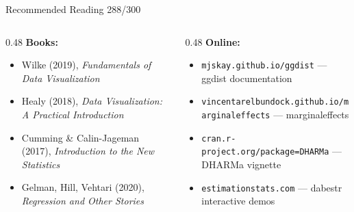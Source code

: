 \documentclass[10pt]{beamer}
\newcommand{\smark}[1]{\hfill{\scriptsize\color{codegray}#1}}
\begin{document}
\begin{frame}{Recommended Reading}
\smark{288/300}
\begin{columns}[T]
\begin{column}{0.48\textwidth}
    \textbf{Books:}
    \begin{itemize}
        \item Wilke (2019), \textit{Fundamentals of Data Visualization}
        \item Healy (2018), \textit{Data Visualization: A Practical Introduction}
        \item Cumming \& Calin-Jageman (2017), \textit{Introduction to the New Statistics}
        \item Gelman, Hill, Vehtari (2020), \textit{Regression and Other Stories}
    \end{itemize}
\end{column}
\begin{column}{0.48\textwidth}
    \textbf{Online:}
    \begin{itemize}
        \item \texttt{mjskay.github.io/ggdist} --- ggdist documentation
        \item \texttt{vincentarelbundock.github.io/marginaleffects} --- marginaleffects
        \item \texttt{cran.r-project.org/package=DHARMa} --- DHARMa vignette
        \item \texttt{estimationstats.com} --- dabestr interactive demos
    \end{itemize}
\end{column}
\end{columns}
\end{frame}
\end{document}

